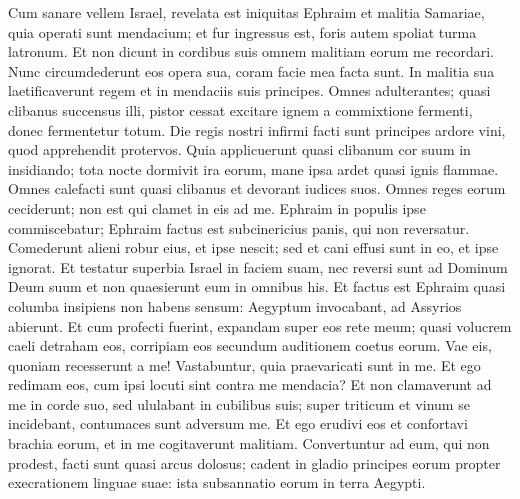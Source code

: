 \begin{biblechapter}
\begin{biblechapter}
\begin{biblechapter}
\begin{biblechapter}
\begin{biblechapter}
\begin{biblechapter}
\begin{biblechapter}
 \verse Cum sanare vellem Israel,
 revelata est iniquitas Ephraim
 et malitia Samariae,
 quia operati sunt mendacium;
 et fur ingressus est,
 foris autem spoliat turma latronum.
 \verse Et non dicunt in cordibus suis
 omnem malitiam eorum me recordari.
 Nunc circumdederunt eos opera sua,
 coram facie mea facta sunt.
 \verse In malitia sua laetificaverunt regem et in mendaciis suis principes.
 \verse Omnes adulterantes;
 quasi clibanus succensus illi,
 pistor cessat excitare ignem
 a commixtione fermenti, donec fermentetur totum.
 \verse Die regis nostri
 infirmi facti sunt principes ardore vini,
 quod apprehendit protervos.
 \verse Quia applicuerunt quasi clibanum cor suum
 in insidiando;
 tota nocte dormivit ira eorum,
 mane ipsa ardet quasi ignis flammae.
 \verse Omnes calefacti sunt quasi clibanus
 et devorant iudices suos.
 Omnes reges eorum ceciderunt;
 non est qui clamet in eis ad me.
 \verse Ephraim in populis ipse commiscebatur;
 Ephraim factus est subcinericius panis, qui non reversatur.
 \verse Comederunt alieni robur eius,
 et ipse nescit;
 sed et cani effusi sunt in eo,
 et ipse ignorat.
 \verse Et testatur superbia Israel in faciem suam,
 nec reversi sunt ad Dominum Deum suum
 et non quaesierunt eum in omnibus his.
 \verse Et factus est Ephraim quasi columba
 insipiens non habens sensum:
 Aegyptum invocabant,
 ad Assyrios abierunt.
 \verse Et cum profecti fuerint,
 expandam super eos rete meum;
 quasi volucrem caeli detraham eos, corripiam eos secundum auditionem coetus eorum.
 \verse Vae eis, quoniam recesserunt a me!
 Vastabuntur, quia praevaricati sunt in me.
 Et ego redimam eos,
 cum ipsi locuti sint contra me mendacia?
 \verse Et non clamaverunt ad me in corde suo,
 sed ululabant in cubilibus suis;
 super triticum et vinum se incidebant,
 contumaces sunt adversum me.
 \verse Et ego erudivi eos et confortavi brachia eorum,
 et in me cogitaverunt malitiam.
 \verse Convertuntur ad eum, qui non prodest,
 facti sunt quasi arcus dolosus;
 cadent in gladio principes eorum
 propter execrationem linguae suae: ista subsannatio eorum in terra Aegypti.
 

\end{biblechapter}
\end{biblechapter}
\end{biblechapter}
\end{biblechapter}
\end{biblechapter}
\end{biblechapter}
\end{biblechapter}
